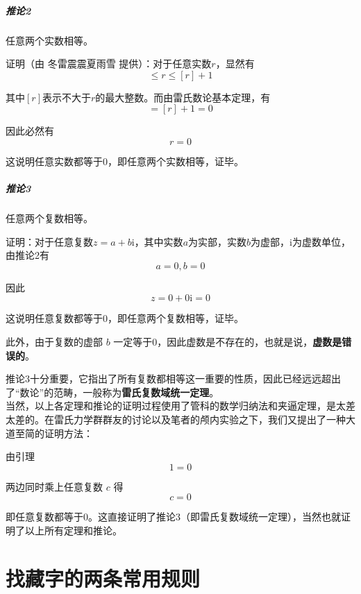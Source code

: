 \documentclass[UTF8,12pt,oneside]{ctexbook}
\begin{document}
\subparagraph{推论2}任意两个实数相等。

证明（由 冬雷震震夏雨雪 提供）：对于任意实数$r$，显然有
\begin{equation}
    [r]\leq r\leq [r]+1
\end{equation}

其中$[r]$表示不大于$r$的最大整数。而由雷氏数论基本定理，有
\begin{equation}
    [r]=[r]+1=0
\end{equation}

因此必然有
\begin{equation}
    r=0
\end{equation}

这说明任意实数都等于0，即任意两个实数相等，证毕。

\subparagraph{推论3}任意两个复数相等。

证明：对于任意复数$z=a+b\text{i}$，其中实数$a$为实部，实数$b$为虚部，i为虚数单位，由推论2有
\begin{equation}
    a=0,b=0
\end{equation}

因此
\begin{equation}
    z=0+0\text{i}=0
\end{equation}

这说明任意复数都等于0，即任意两个复数相等，证毕。

此外，由于复数的虚部 $b$ 一定等于0，因此虚数是不存在的，也就是说，\textbf{虚数是错误的}。

推论3十分重要，它指出了所有复数都相等这一重要的性质，因此已经远远超出了“数论”的范畴，一般称为\textbf{雷氏复数域统一定理}。
~\\

当然，以上各定理和推论的证明过程使用了管科的数学归纳法和夹逼定理，是太差太差的。在雷氏力学群群友的讨论以及笔者的颅内实验之下，我们又提出了一种大道至简的证明方法：

由引理
\begin{equation}
    1=0
\end{equation}

两边同时乘上任意复数 $c$ 得
\begin{equation}
    c=0
\end{equation}

即任意复数都等于0。这直接证明了推论3（即雷氏复数域统一定理），当然也就证明了以上所有定理和推论。


\section{找藏字的两条常用规则}
\end{document}
